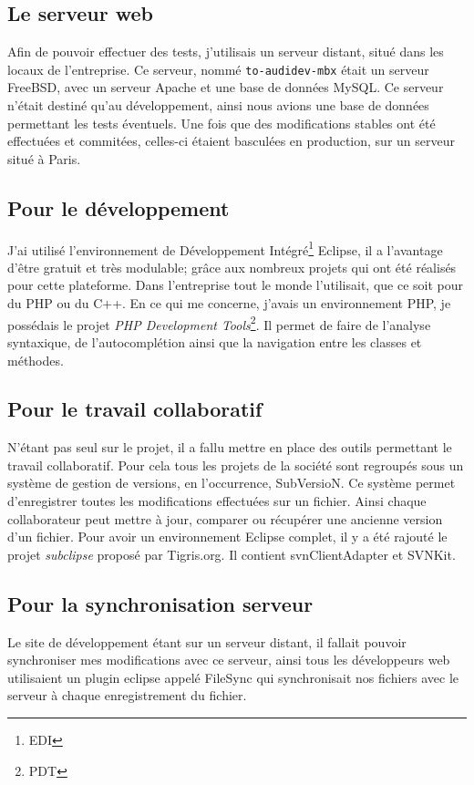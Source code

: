 	\subsection{Le serveur web}
		Afin de pouvoir effectuer des tests, j'utilisais un serveur distant, situé dans les locaux de l'entreprise.
		Ce serveur, nommé \texttt{to-audidev-mbx} était un serveur FreeBSD, avec un serveur Apache et une base de données MySQL.
		Ce serveur n'était destiné qu'au développement, ainsi nous avions une base de données permettant les tests éventuels. Une fois que des
		modifications stables ont été effectuées et commitées, celles-ci étaient basculées en production, sur un serveur situé à Paris.
	\subsection{Pour le développement}
		J'ai utilisé l'environnement de Développement Intégré\footnote{EDI} Eclipse, il a l'avantage d'être gratuit et très modulable; grâce aux nombreux
		projets qui ont été réalisés pour cette plateforme. Dans l'entreprise tout le monde l'utilisait, que ce soit pour du PHP ou du C++. En
		ce qui me concerne, j'avais un environnement PHP, je possédais le projet \textit{PHP Development Tools}\footnote{PDT}. Il
		permet de faire de l'analyse syntaxique, de l'autocomplétion ainsi que la navigation entre les classes et méthodes.
	\subsection{Pour le travail collaboratif}
		N'étant pas seul sur le projet, il a fallu mettre en place des outils permettant le travail collaboratif. Pour cela tous les projets
		de la société sont regroupés sous un système de gestion de versions, en l'occurrence, SubVersioN. Ce système permet d'enregistrer toutes les modifications
		effectuées sur un fichier. Ainsi chaque collaborateur peut mettre à jour, comparer ou récupérer une ancienne version d'un fichier.
		Pour avoir un environnement Eclipse complet, il y a été rajouté le projet \textit{subclipse} proposé par Tigris.org. Il contient svnClientAdapter
		et SVNKit.
	\subsection{Pour la synchronisation serveur}
		Le site de développement étant sur un serveur distant, il fallait pouvoir synchroniser mes modifications avec ce serveur, ainsi tous les développeurs web utilisaient un plugin eclipse appelé FileSync qui synchronisait nos fichiers avec le serveur à chaque enregistrement du fichier.
